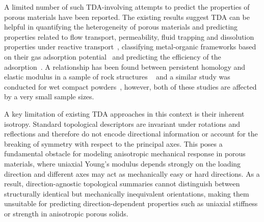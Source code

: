 \documentclass[sn-mathphys,Numbered]{sn-jnl}
\theoremstyle{definition}
\begin{document}
A limited number of such TDA-involving attempts to predict the properties of porous materials have been reported. The existing results suggest TDA can be helpful in quantifying the heterogeneity of porous materials and predicting properties related to flow transport, permeability, fluid trapping and dissolution properties under reactive transport~\cite{Robins2016, Herring2019, Moon2019, Thompson2023, Lisitsa2020}, classifying  metal-organic frameworks based on their gas adsorption potential~\cite{Lee2017} and predicting the efficiency of the adsorption~\cite{Krishnapriyan2021, Chen2025, Wang2025, Lee2017}. A relationship has been found between persistent homology and elastic modulus in a sample of rock structures ~\cite{Jiang2018} and a similar study was conducted for wet compact powders~\cite{Ishihara2023}, however, both of these studies are affected by a very small sample sizes.

A key limitation of existing TDA approaches in this context is their inherent isotropy. Standard topological descriptors are invariant under rotations and reflections and therefore do not encode directional information or account for the breaking of symmetry with respect to the principal axes. This poses a fundamental obstacle for modeling anisotropic mechanical response in porous materials, where uniaxial Young’s modulus depends strongly on the loading direction and different axes may act as mechanically easy or hard directions. As a result, direction-agnostic topological summaries cannot distinguish between structurally identical but mechanically inequivalent orientations, making them unsuitable for predicting direction-dependent properties such as uniaxial stiffness or strength in anisotropic porous solids.
\end{document}
